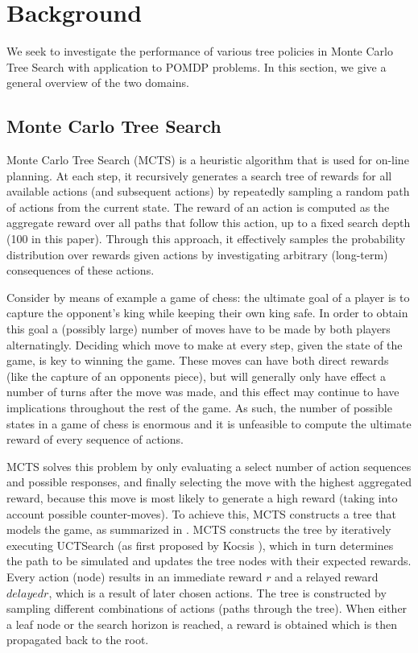 
\section{Background}
We seek to investigate the performance of various tree policies in Monte Carlo Tree Search with application to POMDP problems. In this section, we give a general overview of the two domains.

\subsection{Monte Carlo Tree Search}
Monte Carlo Tree Search (MCTS) is a heuristic algorithm that is used for on-line planning. At each step, it recursively generates a search tree of rewards for all available actions (and subsequent actions) by repeatedly sampling a random path of actions from the current state. The reward of an action is computed as the aggregate reward over all paths that follow this action, up to a fixed search depth (100 in this paper). Through this approach, it effectively samples the probability distribution over rewards given actions by investigating arbitrary (long-term) consequences of these actions.

Consider by means of example a game of chess: the ultimate goal of a player is to capture the opponent's king while keeping their own king safe. In order to obtain this goal a (possibly large) number of moves have to be made by both players alternatingly. Deciding which move to make at every step, given the state of the game, is key to winning the game. These moves can have both direct rewards (like the capture of an opponents piece), but will generally only have effect a number of turns after the move was made, and this effect may continue to have implications throughout the rest of the game. As such, the number of possible states in a game of chess is enormous and it is unfeasible to compute the ultimate reward of every sequence of actions.

MCTS solves this problem by only evaluating a select number of action sequences and possible responses, and finally selecting the move with the highest aggregated reward, because this move is most likely to generate a high reward (taking into account possible counter-moves). To achieve this, MCTS constructs a tree that models the game, as summarized in . MCTS constructs the tree by iteratively executing UCTSearch (as first proposed by Kocsis \etal \cite{kocsis2006bandit}), which in turn determines the path to be simulated and updates the tree nodes with their expected rewards. Every action (node) results in an immediate reward $r$ and a relayed reward $delayedr$, which is a result of later chosen actions. The tree is constructed by sampling different combinations of actions (paths through the tree). When either a leaf node or the search horizon is reached, a reward is obtained which is then propagated back to the root. 

